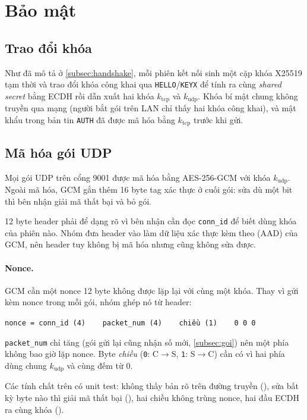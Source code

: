 \section{Bảo mật}
\label{sec:bao-mat}

\subsection{Trao đổi khóa}
Như đã mô tả ở \cref{subsec:handshake}, mỗi phiên kết nối sinh một cặp khóa X25519 tạm thời \cite{rfc7748} và trao
đổi khóa công khai qua \texttt{HELLO}/\texttt{KEYX} để tính ra cùng \emph{shared secret} bằng ECDH rồi dẫn xuất hai
khóa $k_\text{tcp}$ và $k_\text{udp}$. Khóa bí mật chung không truyền qua mạng (người bắt gói trên LAN chỉ thấy hai
khóa công khai), và mật khẩu trong bản tin \texttt{AUTH} đã được mã hóa bằng $k_\text{tcp}$ trước khi gửi.

\subsection{Mã hóa gói UDP}
Mọi gói UDP trên cổng 9001 được mã hóa bằng AES-256-GCM \cite{gcm} với khóa $k_\text{udp}$. Ngoài mã hóa, GCM gắn
thêm 16 byte tag xác thực ở cuối gói: sửa dù một bit thì bên nhận giải mã thất bại và bỏ gói.

12 byte header phải để dạng rõ vì bên nhận cần đọc \texttt{conn\_id} để biết dùng khóa của phiên nào. Nhóm đưa
header vào làm dữ liệu xác thực kèm theo (AAD) của GCM, nên header tuy không bị mã hóa nhưng cũng không sửa được.

\paragraph{Nonce.} GCM cần một nonce 12 byte không được lặp lại với cùng một khóa. Thay vì gửi kèm nonce trong mỗi
gói, nhóm ghép nó từ header:
\begin{center}
  \texttt{nonce = conn\_id (4) \,\textbar\, packet\_num (4) \,\textbar\, chiều (1) \,\textbar\, 0 0 0}
\end{center}
\texttt{packet\_num} chỉ tăng (gói gửi lại cũng nhận số mới, \cref{subsec:goi}) nên một phía không bao giờ lặp
nonce. Byte \emph{chiều} (\texttt{0}: C$\to$S, \texttt{1}: S$\to$C) cần có vì hai phía dùng chung $k_\text{udp}$
và cùng đếm từ 0.

Các tính chất trên có unit test: không thấy bản rõ trên đường truyền (), sửa bất kỳ byte
nào thì giải mã thất bại (), hai chiều không trùng nonce, hai đầu ECDH ra cùng
khóa ().

